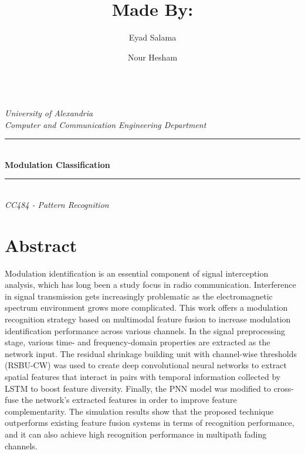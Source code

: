 \documentclass[12pt,a4paper]{article}
\title{Made By:}
\author[1]{Eyad Salama}
\author[2]{Nour Hesham}
\affil[1]{Computer and Communication Department, Alexandria University}
\affil[2]{Computer and Communication Department, Alexandria University}
\begin{document}
\newcommand{\HRule}{\rule{\linewidth}{0.5mm}}
    {\centering
    
    \quad\\[1.5cm]
    \textsl{\Large University of Alexandria}\\[0.5cm] 
    \textsl{\large Computer and Communication Engineering Department}\\[0.5cm] 
    \makeatletter
    \HRule \\[0.4cm]
    { \huge \bfseries Modulation Classification}\\[0.4cm] 
    \HRule \\[1.5cm]
    {\large \emph{CC484 - Pattern Recognition}}\\[0.5cm]
    }\par
    \maketitle

    \newpage

    \tableofcontents
    
    \newpage
    
    \section{Abstract}
    Modulation identification is an essential component of signal interception analysis, which has long been a study focus in radio communication. Interference in signal transmission gets increasingly problematic as the electromagnetic spectrum environment grows more complicated. This work offers a modulation recognition strategy based on multimodal feature fusion to increase modulation identification performance across various channels.\newline
    In the signal preprocessing stage, various time- and frequency-domain properties are extracted as the network input. The residual shrinkage building unit with channel-wise thresholds (RSBU-CW) was used to create deep convolutional neural networks to extract spatial features that interact in pairs with temporal information collected by LSTM to boost feature diversity.
    Finally, the PNN model was modified to cross-fuse the network's extracted features in order to improve feature complementarity. \newline
    The simulation results show that the proposed technique outperforms existing feature fusion systems in terms of recognition performance, and it can also achieve high recognition performance in multipath fading channels.
\end{document}
